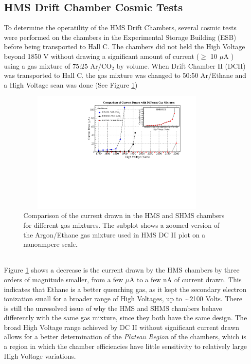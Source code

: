 \documentclass[letterpaper, 10 pt, conference]{ieeeconf}  %
\begin{document}
\subsection{HMS Drift Chamber Cosmic Tests}
To determine the operatility of the HMS Drift Chambers, several cosmic tests were performed on the chambers in the Experimental Storage Building (ESB) before being transported
to Hall C. The chambers did not held the High Voltage beyond 1850 V without drawing a significant amount of current ($\geq$ 10 $\mu$A ) using a gas mixture of 75:25 Ar/CO$_{2}$ by
volume. When Drift Chamber II (DCII) was transported to Hall C, the gas mixture was changed to 50:50 Ar/Ethane and a High Voltage scan was done (See Figure \ref{fig:current_draw})  
\begin{figure}[h!]
  \centering
  \includegraphics[width=4.0in, height=2.4in]{dc2_tests/gas_mix_current_drawn.pdf}
  \caption{Comparison of the current drawn in the HMS and SHMS chambers for different gas mixtures. The subplot shows a zoomed version of the Argon/Ethane gas mixture used in HMS DC II plot on a nanoampere scale.}
  \label{fig:current_draw}
\end{figure} \\
Figure \ref{fig:current_draw} shows a decrease is the current drawn by the HMS chambers by three orders of magnitude smaller, from a few $\mu$A to a few nA of current drawn. This
indicates that Ethane is a better quenching gas, as it kept the secondary electron ionization small for a broader range of High Voltages, up to $\sim$2100 Volts. There is still the
unresolved issue of why the HMS and SHMS chambers behave differently with the same gas mixture, since they both have the same design. The broad High Voltage range achieved by DC II without
significant current drawn allows for a better determination of the \textit{Plateau Region} of the chambers, which is a region in which the chamber efficiencies have little sensitivity
to relatively large High Voltage variations. \\
\end{document}
